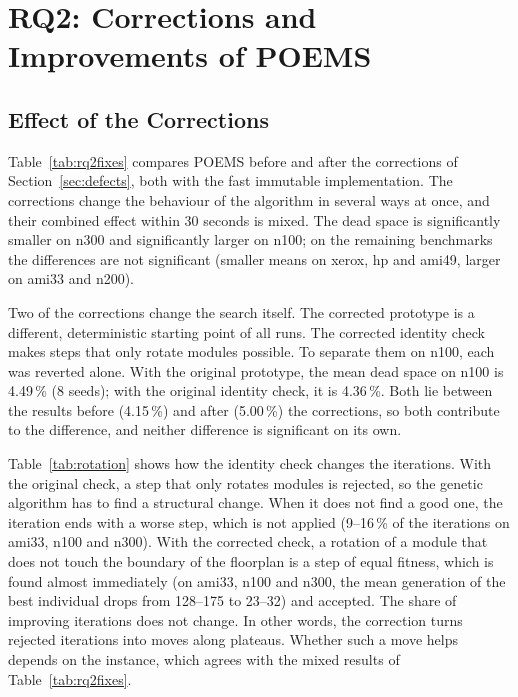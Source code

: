 \section{RQ2: Corrections and Improvements of POEMS}
\label{sec:rq2}

\subsection{Effect of the Corrections}

Table~\ref{tab:rq2fixes} compares POEMS before and after the corrections of Section~\ref{sec:defects}, both with the fast immutable implementation. The corrections change the behaviour of the algorithm in several ways at once, and their combined effect within 30 seconds is mixed. The dead space is significantly smaller on n300 and significantly larger on n100; on the remaining benchmarks the differences are not significant (smaller means on xerox, hp and ami49, larger on ami33 and n200).



Two of the corrections change the search itself. The corrected prototype is a different, deterministic starting point of all runs. The corrected identity check makes steps that only rotate modules possible. To separate them on n100, each was reverted alone. With the original prototype, the mean dead space on n100 is 4.49\,\% (8 seeds); with the original identity check, it is 4.36\,\%. Both lie between the results before (4.15\,\%) and after (5.00\,\%) the corrections, so both contribute to the difference, and neither difference is significant on its own.

Table~\ref{tab:rotation} shows how the identity check changes the iterations. With the original check, a step that only rotates modules is rejected, so the genetic algorithm has to find a structural change. When it does not find a good one, the iteration ends with a worse step, which is not applied (9--16\,\% of the iterations on ami33, n100 and n300). With the corrected check, a rotation of a module that does not touch the boundary of the floorplan is a step of equal fitness, which is found almost immediately (on ami33, n100 and n300, the mean generation of the best individual drops from 128--175 to 23--32) and accepted. The share of improving iterations does not change. In other words, the correction turns rejected iterations into moves along plateaus. Whether such a move helps depends on the instance, which agrees with the mixed results of Table~\ref{tab:rq2fixes}.

